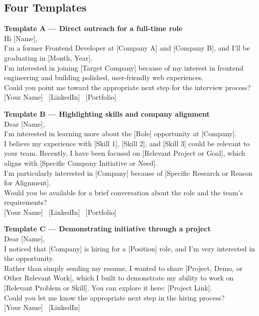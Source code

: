 \subsection{Four Templates}

\begin{template}
\textbf{Template A --- Direct outreach for a full-time role}\\[4pt]
Hi [Name],\\[2pt]
I'm a former Frontend Developer at [Company A] and [Company B], and I'll be graduating in [Month, Year].\\[2pt]
I'm interested in joining [Target Company] because of my interest in frontend engineering and building polished,
user-friendly web experiences.\\[2pt]
Could you point me toward the appropriate next step for the interview process?\\[2pt]
[Your Name] \textbar\ [LinkedIn] \textbar\ [Portfolio]
\end{template}

\begin{template}
\textbf{Template B --- Highlighting skills and company alignment}\\[4pt]
Dear [Name],\\[2pt]
I'm interested in learning more about the [Role] opportunity at [Company].\\[2pt]
I believe my experience with [Skill 1], [Skill 2], and [Skill 3] could be relevant to your team. Recently, I
have been focused on [Relevant Project or Goal], which aligns with [Specific Company Initiative or Need].\\[2pt]
I'm particularly interested in [Company] because of [Specific Research or Reason for Alignment].\\[2pt]
Would you be available for a brief conversation about the role and the team's requirements?\\[2pt]
[Your Name] \textbar\ [LinkedIn] \textbar\ [Portfolio]
\end{template}

\begin{template}
\textbf{Template C --- Demonstrating initiative through a project}\\[4pt]
Dear [Name],\\[2pt]
I noticed that [Company] is hiring for a [Position] role, and I'm very interested in the opportunity.\\[2pt]
Rather than simply sending my resume, I wanted to share [Project, Demo, or Other Relevant Work], which I built
to demonstrate my ability to work on [Relevant Problem or Skill]. You can explore it here: [Project Link].\\[2pt]
Could you let me know the appropriate next step in the hiring process?\\[2pt]
[Your Name] \textbar\ [LinkedIn]
\end{template}

